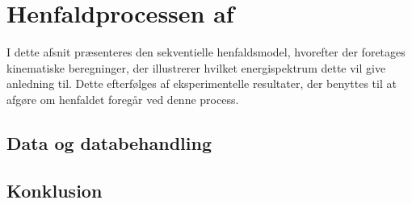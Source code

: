 \chapter{Henfaldprocessen af \Carb}
\label{cha:sekventielt-henfald}
I dette afsnit præsenteres den sekventielle henfaldsmodel, hvorefter der foretages kinematiske
beregninger, der illustrerer hvilket energispektrum dette vil give anledning til. Dette efterfølges
af eksperimentelle resultater, der benyttes til at afgøre om henfaldet foregår ved denne process.  









\section{Data og databehandling}
\label{sec:sek-data}





\section{Konklusion}
\label{sec:sekv-konklusion}



